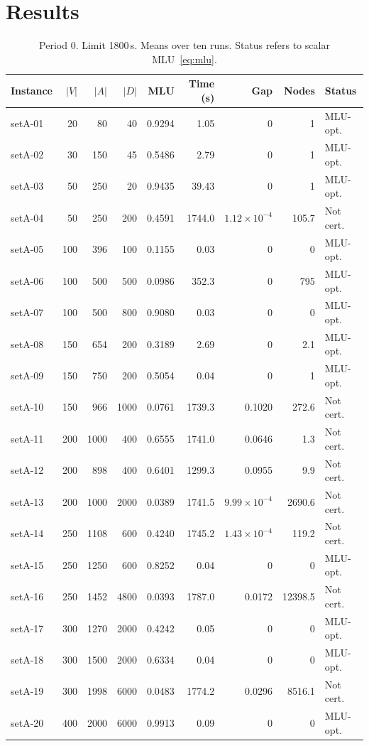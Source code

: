 \section{Results}

\begin{table}[h!]
\centering
\caption{Period 0. Limit 1800\,s. Means over ten runs. Status refers to scalar MLU~\eqref{eq:mlu}.}
\label{tab:t0}
\renewcommand{\arraystretch}{1.15}
\footnotesize
\setlength{\tabcolsep}{4.5pt}
\begin{tabular}{@{}lrrrrrrrl@{}}
\toprule
\textbf{Instance} & \textbf{$|V|$} & \textbf{$|A|$} & \textbf{$|D|$} &
\textbf{MLU} & \textbf{Time (s)} & \textbf{Gap} & \textbf{Nodes} & \textbf{Status} \\
\midrule
setA-01 & 20 & 80 & 40 & 0.9294 & 1.05 & 0 & 1 & MLU-opt. \\
setA-02 & 30 & 150 & 45 & 0.5486 & 2.79 & 0 & 1 & MLU-opt. \\
setA-03 & 50 & 250 & 20 & 0.9435 & 39.43 & 0 & 1 & MLU-opt. \\
setA-04 & 50 & 250 & 200 & 0.4591 & 1744.0 & $1.12\times 10^{-4}$ & 105.7 & Not cert. \\
setA-05 & 100 & 396 & 100 & 0.1155 & 0.03 & 0 & 0 & MLU-opt. \\
setA-06 & 100 & 500 & 500 & 0.0986 & 352.3 & 0 & 795 & MLU-opt. \\
setA-07 & 100 & 500 & 800 & 0.9080 & 0.03 & 0 & 0 & MLU-opt. \\
setA-08 & 150 & 654 & 200 & 0.3189 & 2.69 & 0 & 2.1 & MLU-opt. \\
setA-09 & 150 & 750 & 200 & 0.5054 & 0.04 & 0 & 1 & MLU-opt. \\
setA-10 & 150 & 966 & 1000 & 0.0761 & 1739.3 & 0.1020 & 272.6 & Not cert. \\
setA-11 & 200 & 1000 & 400 & 0.6555 & 1741.0 & 0.0646 & 1.3 & Not cert. \\
setA-12 & 200 & 898 & 400 & 0.6401 & 1299.3 & 0.0955 & 9.9 & Not cert. \\
setA-13 & 200 & 1000 & 2000 & 0.0389 & 1741.5 & $9.99\times 10^{-4}$ & 2690.6 & Not cert. \\
setA-14 & 250 & 1108 & 600 & 0.4240 & 1745.2 & $1.43\times 10^{-4}$ & 119.2 & Not cert. \\
setA-15 & 250 & 1250 & 600 & 0.8252 & 0.04 & 0 & 0 & MLU-opt. \\
setA-16 & 250 & 1452 & 4800 & 0.0393 & 1787.0 & 0.0172 & 12398.5 & Not cert. \\
setA-17 & 300 & 1270 & 2000 & 0.4242 & 0.05 & 0 & 0 & MLU-opt. \\
setA-18 & 300 & 1500 & 2000 & 0.6334 & 0.04 & 0 & 0 & MLU-opt. \\
setA-19 & 300 & 1998 & 6000 & 0.0483 & 1774.2 & 0.0296 & 8516.1 & Not cert. \\
setA-20 & 400 & 2000 & 6000 & 0.9913 & 0.09 & 0 & 0 & MLU-opt. \\
\bottomrule
\end{tabular}
\end{table}

